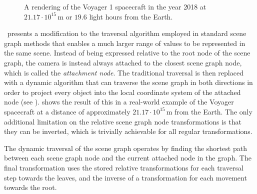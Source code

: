 \begin{figure}
\centering
{}
\caption{A rendering of the Voyager 1 spacecraft in the year 2018 at $21.17 \cdot 10^{15}\,$m or $19.6$ light hours from the Earth.}
\label{contributions:astro:dsg:voyager}
\end{figure}


\paperDSG\ presents a modification to the traversal algorithm employed in standard scene graph methods that enables a much larger range of values to be represented in the same scene.  Instead of being expressed relative to the root node of the scene graph, the camera is instead always attached to the closest scene graph node, which is called the \emph{attachment node}.  The traditional traversal is then replaced with a dynamic algorithm that can traverse the scene graph in both directions in order to project every object into the local coordinate system of the attached node (see ).   shows the result of this in a real-world example of the Voyager spacecraft at a distance of approximately $21.17 \cdot 10^{15}\,$m from the Earth.  The only additional limitation on the relative scene graph node transformations is that they can be inverted, which is trivially achievable for all regular transformations.

The dynamic traversal of the scene graph operates by finding the shortest path between each scene graph node and the current attached node in the graph.  The final transformation uses the stored relative transformations for each traversal step towards the leaves, and the inverse of a transformation for each movement towards the root.

